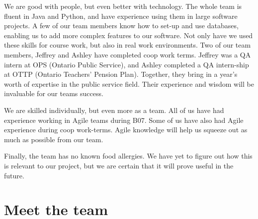 \documentclass[12pt]{scrreprt}
\begin{document}
We are good with people, but even better with technology. The whole team is fluent in Java and Python, and have experience using them in large software projects. A few of our team members know how to set-up and use databases, enabling us to add more complex features to our software. Not only have we used these skills for course work, but also in real work environments. Two of our team members, Jeffrey and Ashley have completed coop work terms. Jeffrey was a QA intern at OPS (Ontario Public Service), and Ashley completed a QA intern-ship at OTTP (Ontario Teachers' Pension Plan). Together, they bring in a year's worth of expertise in the public service field. Their experience and wisdom will be invaluable for our teams success. 

We are skilled individually, but even more as a team. All of us have had experience working in Agile teams during B07. Some of us have also had Agile experience during coop work-terms. Agile knowledge will help us squeeze out as much as possible from our team.

Finally, the team has no known food allergies. We have yet to figure out how this is relevant to our project, but we are certain that it will prove useful in the future.

\section{Meet the team}
\end{document}
